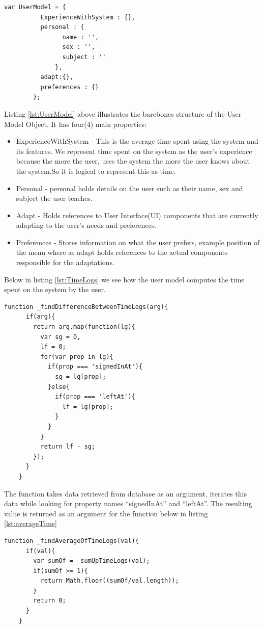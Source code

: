 \begin{lstlisting}[caption={User Model Object Definition}, label={lst:UserModel}]
    var UserModel = {
          ExperienceWithSystem : {},
          personal : {
                name : '',
                sex : '',
                subject : ''
              },
          adapt:{},
          preferences : {}
        };
\end{lstlisting}

Listing \ref{lst:UserModel} above illustrates the barebones structure of the User Model Object. It has four(4) main properties:
\begin{itemize}
    \item ExperienceWithSystem - This is the average time spent using the system and its features. We represent time spent on the system as the user's experience because the more the user, uses the system the more the user knows about the system.So it is logical to represent this as time.
    \item Personal - personal holds details on the user such as their name, sex and subject the user teaches.
    \item Adapt - Holds references to User Interface(UI) components that are currently adapting to the user's needs and preferences.
    \item Preferences - Stores information on what the user prefers, example position of the menu where as adapt holds references to the actual components responsible for the adaptations.
\end{itemize}
Below in listing \ref{lst:TimeLogs} we see how the user model computes the time spent on the system by the user.
\begin{lstlisting}[caption={Calculating time spent on the system}, label={lst:TimeLogs}]
    function _findDifferenceBetweenTimeLogs(arg){
      if(arg){
        return arg.map(function(lg){
          var sg = 0,
          lf = 0;
          for(var prop in lg){
            if(prop === 'signedInAt'){
              sg = lg[prop];
            }else{
              if(prop === 'leftAt'){
                lf = lg[prop];
              }
            }
          }
          return lf - sg;
        });
      }
    }
\end{lstlisting}
The function takes data retrieved from database as an argument, iterates this data while looking for property names ``signedInAt'' and ``leftAt''. The resulting value is returned as an argument for the function below in listing \ref{lst:averageTime}

\begin{lstlisting}[caption={Computes average time}, label={lst:averageTime}]
    function _findAverageOfTimeLogs(val){
      if(val){
        var sumOf = _sumUpTimeLogs(val);
        if(sumOf >= 1){
          return Math.floor((sumOf/val.length));
        }
        return 0;
      }
    }
\end{lstlisting}


